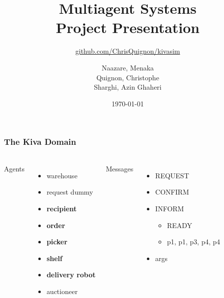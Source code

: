 \documentclass{beamer}
\begin{document}
\title{Multiagent Systems\\
Project Presentation}
\subtitle{\bigskip
\href{https://github.com/ChrisQuignon/kivasim}{github.com/ChrisQuignon/kivasim}}
\author{
Naazare, Menaka \\
Quignon, Christophe \\
Sharghi, Azin Ghaheri \\
} 
\date{\today}

\begin{frame}
\titlepage{}
\end{frame}


\begin{frame}[fragile]
\frametitle{The Kiva Domain}
\framesubtitle{}

\begin{columns}[t,onlytextwidth]
Agents
\begin{itemize}
\item warehouse
\item request dummy
\item \textbf{recipient}
\item \textbf{order}
\item \textbf{picker}
\item \textbf{shelf}
\item \textbf{delivery robot}
\item auctioneer
\end{itemize}

Messages
\begin{itemize}
\item REQUEST
\item CONFIRM
\item INFORM
	\begin{itemize}
	\item READY
	\item p1, p1, p3, p4, p4
	\end{itemize}
\item args
\end{itemize}

\end{columns}

\end{frame}
\end{document}
